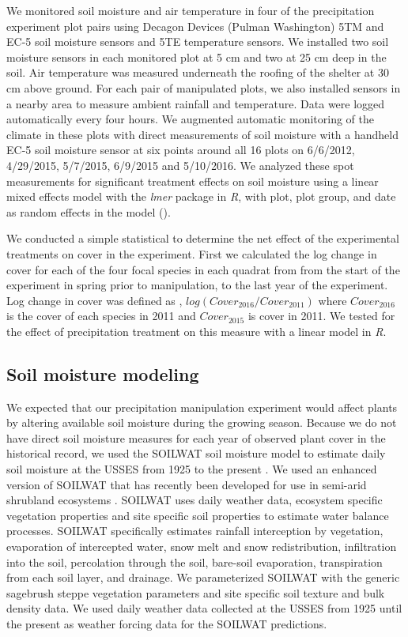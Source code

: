 \documentclass[11pt]{article}
\begin{document}
\begin{doublespacing}
We monitored soil moisture and air temperature in four of the precipitation experiment plot pairs using Decagon Devices (Pulman Washington) 5TM and EC-5 soil moisture sensors and 5TE temperature sensors.  We installed two soil moisture sensors in each monitored plot at 5 cm and two at 25 cm deep in the soil.  Air temperature was measured underneath the roofing of the shelter at 30 cm above ground. For each pair of manipulated plots, we also installed sensors in a nearby area to measure ambient rainfall and temperature. Data were logged automatically every four hours. We augmented automatic monitoring of the climate in these plots with direct measurements of soil moisture with a handheld EC-5 soil moisture sensor at six points around all 16 plots on 6/6/2012, 4/29/2015, 5/7/2015, 6/9/2015 and 5/10/2016. We analyzed these spot measurements for significant treatment effects on soil moisture using a linear mixed effects model with the \textit{lmer} package in \textit{R}, with plot, plot group, and date as random effects in the model (\citep{bates_fitting_2015}).    

We conducted a simple statistical to determine the net effect of the experimental treatments on cover in the experiment. First we calculated the log change in cover for each of the four focal species in each quadrat from from the start of the experiment in spring prior to manipulation, to the last year of the experiment. Log change in cover was defined as , $log(Cover_{2016}/Cover_{2011})$ where $Cover_{2016}$ is the cover of each species in 2011 and $Cover_{2015}$ is cover in 2011. We tested for the effect of precipitation treatment on this measure with a linear model in \textit{R}.

\subsection*{Soil moisture modeling}

We expected that our precipitation manipulation experiment would affect plants by altering available soil moisture during the growing season.  Because we do not have direct soil moisture measures for each year of observed plant cover in the historical record, we used the SOILWAT soil moisture model to estimate daily soil moisture at the USSES from 1925 to the present \citep{sala_long-term_1992}. We used an enhanced version of SOILWAT that has recently been developed for use in semi-arid shrubland ecosystems \citep{bradford_ecohydrology_2014}. SOILWAT uses daily weather data, ecosystem specific vegetation properties and site specific soil properties to estimate water balance processes. SOILWAT specifically estimates rainfall interception by vegetation, evaporation of intercepted water, snow melt and snow redistribution, infiltration into the soil, percolation through the soil, bare-soil evaporation, transpiration from each soil layer, and drainage. We parameterized SOILWAT with the generic sagebrush steppe vegetation parameters and site specific soil texture and bulk density data. We used daily weather data collected at the USSES from 1925 until the present as weather forcing data for the SOILWAT predictions.  


\end{doublespacing}
\end{document}
